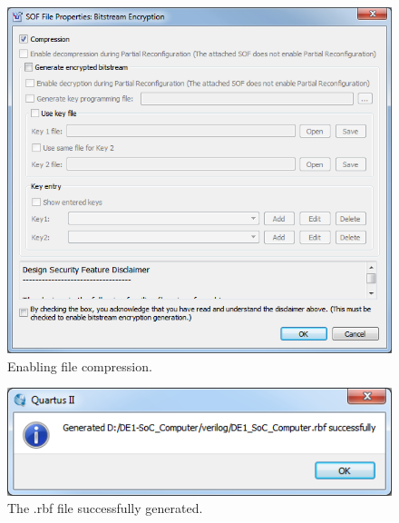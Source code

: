 \documentclass[11pt, twoside, pdftex]{article}
\newcommand{\commonPath}{../../Common}
\begin{document}
\begin{figure}[H]
   \begin{center}
       \includegraphics[scale=0.7]{figures/rbf_conversion_2}
   \end{center}
   \caption{Enabling file compression.}
	\label{fig:rbf_conversion_2}
\end{figure}
\begin{figure}[H]
   \begin{center}
       \includegraphics[scale=0.7]{figures/rbf_conversion_3}
   \end{center}
   \caption{The .rbf file successfully generated.}
	\label{fig:rbf_conversion_3}
\end{figure}



\end{document}
